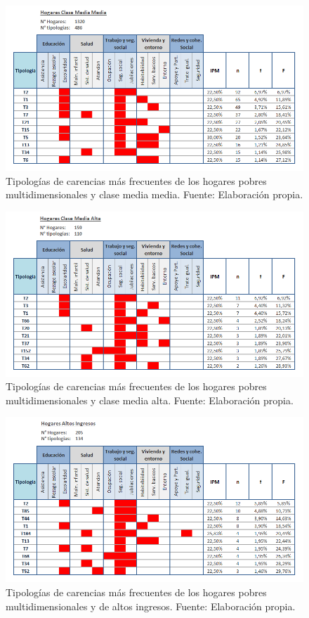 \documentclass[12pt,letterpaper,spanish]{article}
\begin{document}
\begin{figure}[H]
    \centering
    \includegraphics[width=\textwidth]{Max/tipol_CMM.png}
    \caption{Tipologías de carencias más frecuentes de los hogares pobres multidimensionales y clase media media. Fuente: Elaboración propia.}
    \label{TipCMM}
\end{figure}

\begin{figure}[H]
    \centering
    \includegraphics[width=\textwidth]{Max/tipol_CMA.png}
    \caption{Tipologías de carencias más frecuentes de los hogares pobres multidimensionales y clase media alta. Fuente: Elaboración propia.}
    \label{TipCMA}
\end{figure}

\begin{figure}[H]
    \centering
    \includegraphics[width=\textwidth]{Max/tipol_AI.png}
    \caption{Tipologías de carencias más frecuentes de los hogares pobres multidimensionales y de altos ingresos. Fuente: Elaboración propia.}
    \label{TipAI}
\end{figure}
\end{document}
